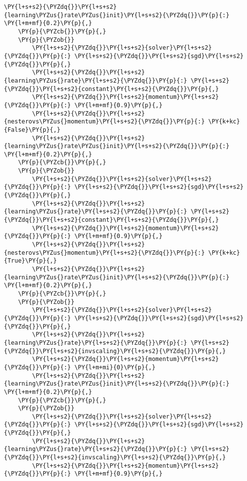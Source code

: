 \begin{Verbatim}[commandchars=\\\{\}]
        \PY{l+s+s2}{\PYZdq{}}\PY{l+s+s2}{learning\PYZus{}rate\PYZus{}init}\PY{l+s+s2}{\PYZdq{}}\PY{p}{:} \PY{l+m+mf}{0.2}\PY{p}{,}
    \PY{p}{\PYZcb{}}\PY{p}{,}
    \PY{p}{\PYZob{}}
        \PY{l+s+s2}{\PYZdq{}}\PY{l+s+s2}{solver}\PY{l+s+s2}{\PYZdq{}}\PY{p}{:} \PY{l+s+s2}{\PYZdq{}}\PY{l+s+s2}{sgd}\PY{l+s+s2}{\PYZdq{}}\PY{p}{,}
        \PY{l+s+s2}{\PYZdq{}}\PY{l+s+s2}{learning\PYZus{}rate}\PY{l+s+s2}{\PYZdq{}}\PY{p}{:} \PY{l+s+s2}{\PYZdq{}}\PY{l+s+s2}{constant}\PY{l+s+s2}{\PYZdq{}}\PY{p}{,}
        \PY{l+s+s2}{\PYZdq{}}\PY{l+s+s2}{momentum}\PY{l+s+s2}{\PYZdq{}}\PY{p}{:} \PY{l+m+mf}{0.9}\PY{p}{,}
        \PY{l+s+s2}{\PYZdq{}}\PY{l+s+s2}{nesterovs\PYZus{}momentum}\PY{l+s+s2}{\PYZdq{}}\PY{p}{:} \PY{k+kc}{False}\PY{p}{,}
        \PY{l+s+s2}{\PYZdq{}}\PY{l+s+s2}{learning\PYZus{}rate\PYZus{}init}\PY{l+s+s2}{\PYZdq{}}\PY{p}{:} \PY{l+m+mf}{0.2}\PY{p}{,}
    \PY{p}{\PYZcb{}}\PY{p}{,}
    \PY{p}{\PYZob{}}
        \PY{l+s+s2}{\PYZdq{}}\PY{l+s+s2}{solver}\PY{l+s+s2}{\PYZdq{}}\PY{p}{:} \PY{l+s+s2}{\PYZdq{}}\PY{l+s+s2}{sgd}\PY{l+s+s2}{\PYZdq{}}\PY{p}{,}
        \PY{l+s+s2}{\PYZdq{}}\PY{l+s+s2}{learning\PYZus{}rate}\PY{l+s+s2}{\PYZdq{}}\PY{p}{:} \PY{l+s+s2}{\PYZdq{}}\PY{l+s+s2}{constant}\PY{l+s+s2}{\PYZdq{}}\PY{p}{,}
        \PY{l+s+s2}{\PYZdq{}}\PY{l+s+s2}{momentum}\PY{l+s+s2}{\PYZdq{}}\PY{p}{:} \PY{l+m+mf}{0.9}\PY{p}{,}
        \PY{l+s+s2}{\PYZdq{}}\PY{l+s+s2}{nesterovs\PYZus{}momentum}\PY{l+s+s2}{\PYZdq{}}\PY{p}{:} \PY{k+kc}{True}\PY{p}{,}
        \PY{l+s+s2}{\PYZdq{}}\PY{l+s+s2}{learning\PYZus{}rate\PYZus{}init}\PY{l+s+s2}{\PYZdq{}}\PY{p}{:} \PY{l+m+mf}{0.2}\PY{p}{,}
    \PY{p}{\PYZcb{}}\PY{p}{,}
    \PY{p}{\PYZob{}}
        \PY{l+s+s2}{\PYZdq{}}\PY{l+s+s2}{solver}\PY{l+s+s2}{\PYZdq{}}\PY{p}{:} \PY{l+s+s2}{\PYZdq{}}\PY{l+s+s2}{sgd}\PY{l+s+s2}{\PYZdq{}}\PY{p}{,}
        \PY{l+s+s2}{\PYZdq{}}\PY{l+s+s2}{learning\PYZus{}rate}\PY{l+s+s2}{\PYZdq{}}\PY{p}{:} \PY{l+s+s2}{\PYZdq{}}\PY{l+s+s2}{invscaling}\PY{l+s+s2}{\PYZdq{}}\PY{p}{,}
        \PY{l+s+s2}{\PYZdq{}}\PY{l+s+s2}{momentum}\PY{l+s+s2}{\PYZdq{}}\PY{p}{:} \PY{l+m+mi}{0}\PY{p}{,}
        \PY{l+s+s2}{\PYZdq{}}\PY{l+s+s2}{learning\PYZus{}rate\PYZus{}init}\PY{l+s+s2}{\PYZdq{}}\PY{p}{:} \PY{l+m+mf}{0.2}\PY{p}{,}
    \PY{p}{\PYZcb{}}\PY{p}{,}
    \PY{p}{\PYZob{}}
        \PY{l+s+s2}{\PYZdq{}}\PY{l+s+s2}{solver}\PY{l+s+s2}{\PYZdq{}}\PY{p}{:} \PY{l+s+s2}{\PYZdq{}}\PY{l+s+s2}{sgd}\PY{l+s+s2}{\PYZdq{}}\PY{p}{,}
        \PY{l+s+s2}{\PYZdq{}}\PY{l+s+s2}{learning\PYZus{}rate}\PY{l+s+s2}{\PYZdq{}}\PY{p}{:} \PY{l+s+s2}{\PYZdq{}}\PY{l+s+s2}{invscaling}\PY{l+s+s2}{\PYZdq{}}\PY{p}{,}
        \PY{l+s+s2}{\PYZdq{}}\PY{l+s+s2}{momentum}\PY{l+s+s2}{\PYZdq{}}\PY{p}{:} \PY{l+m+mf}{0.9}\PY{p}{,}

\end{Verbatim}
